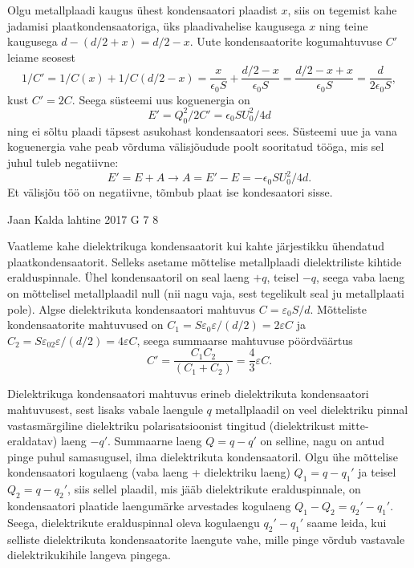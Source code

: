 \documentclass[11pt, twoside]{article}
\begin{document}
{{Olgu metallplaadi kaugus ühest kondensaatori plaadist $x$, siis on tegemist kahe jadamisi plaatkondensaatoriga, üks plaadivahelise kaugusega $x$ ning teine kaugusega $d - (d/2 + x) = d/2 - x$. Uute kondensaatorite kogumahtuvuse $C'$ leiame seosest $$1/C' = 1/C(x) + 1/C(d/2-x) = \frac{x}{\epsilon_0 S} + \frac{d/2 - x}{\epsilon_0 S} = \frac{d/2 - x + x}{\epsilon_0 S} = \frac{d}{2 \epsilon_0 S},$$kust $C' = 2C$. Seega süsteemi uus koguenergia on $$E' = Q_0^2 / 2C' = \epsilon_0 S U_0^2/ 4 d$$ ning ei sõltu plaadi täpsest asukohast kondensaatori sees. Süsteemi uue ja vana koguenergia vahe peab võrduma välisjõudude poolt sooritatud tööga, mis sel juhul tuleb negatiivne:
$$E' = E + A \rightarrow A = E' - E = - \epsilon_0 S U_0^2/ 4 d.$$
Et välisjõu töö on negatiivne, tõmbub plaat ise kondesaatori sisse.
\fi
}

{Jaan Kalda} %
{lahtine} %
{2017} %
{G 7} %
{8} %
{

\ifSolution
Vaatleme kahe dielektrikuga kondensaatorit kui kahte järjestikku ühendatud plaatkondensaatorit. Selleks asetame mõttelise metallplaadi dielektriliste kihtide eralduspinnale. Ühel kondensaatoril on seal laeng $+q$, teisel $-q$, seega vaba laeng on mõttelisel metallplaadil null (nii nagu vaja, sest tegelikult seal ju metallplaati pole). Algse dielektrikuta kondensaatori mahtuvus $C=\varepsilon_0S/d$. Mõtteliste kondensaatorite mahtuvused on $C_1=S\varepsilon_0\varepsilon/(d/2)=2\varepsilon C$ ja $C_2=S\varepsilon_02\varepsilon/(d/2)=4\varepsilon C$, seega summaarse mahtuvuse pöördväärtus 
\[
C'=\frac{C_1C_2}{(C_1+C_2)}=\frac 43\varepsilon C.
\]

Dielektrikuga kondensaatori mahtuvus erineb dielektrikuta kondensaatori mahtuvusest, sest lisaks vabale laengule $q$ metallplaadil on veel dielektriku pinnal vastasmärgiline dielektriku polarisatsioonist tingitud (dielektrikust mitte-eraldatav) laeng $-q'$. Summaarne laeng $Q=q-q'$ on selline, nagu on antud pinge puhul samasugusel, ilma dielektrikuta kondensaatoril. Olgu ühe mõttelise kondensaatori kogulaeng (vaba laeng + dielektriku laeng) $Q_1=q-q_1'$ ja teisel $Q_2=q-q_2'$, siis sellel plaadil, mis jääb dielektrikute eralduspinnale, on kondensaatori plaatide laengumärke arvestades kogulaeng $Q_1-Q_2=q_2'-q_1'$. Seega, dielektrikute eralduspinnal oleva kogulaengu $q_2'-q_1'$ saame leida, kui selliste dielektrikuta kondensaatorite laengute vahe, mille pinge võrdub vastavale dielektrikukihile langeva pingega. 

}}
\end{document}
